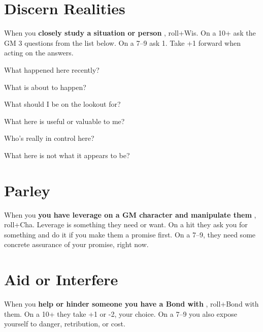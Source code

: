  
\section{Discern Realities}    
 

When you {\bf closely study a situation or person} , roll+Wis. On a 10+ ask the GM 3 questions from the list below. On a 7–9 ask 1. Take +1 forward when acting on the answers.

 
\startitemize[1,packed]

\item What happened here recently?

 
\item What is about to happen?

 
\item What should I be on the lookout for?

 
\item What here is useful or valuable to me?

 
\item Who’s really in control here?

 
\item What here is not what it appears to be?


\stopitemize
 
\section{Parley}   
 

When you {\bf you have leverage on a GM character and manipulate them} , roll+Cha. Leverage is something they need or want. On a hit they ask you for something and do it if you make them a promise first. On a 7–9, they need some concrete assurance of your promise, right now.

 
\section{Aid or Interfere}    
 

When you {\bf help or hinder someone you have a Bond with} , roll+Bond with them. On a 10+ they take +1 or -2, your choice. On a 7–9 you also expose yourself to danger, retribution, or cost.



 
